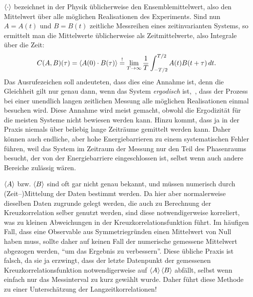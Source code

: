 $\left\langle{\cdot}\right\rangle$ bezeichnet in der Physik üblicherweise den
Ensemblemittelwert, also den Mittelwert über alle möglichen
Realisationen des Experiments. Sind nun $A=A(t)$ und $B=B(t)$
zeitliche Messreihen eines zeitinvarianten Systems, so ermittelt man
die Mittelwerte üblicherweise als Zeitmittelwerte, also Integrale über
die Zeit:
\begin{equation}
  \label{eq:crosscorrtime}
  C(A,B)(\tau) = \left\langle{A(0)\cdot B(\tau)}\right\rangle \stackrel{!}{=}
  \lim_{T\to\infty}\frac{1}{T}\int_{-T/2}^{T/2} A(t)B(t+\tau)\,dt.
\end{equation}
Das Ausrufezeichen soll andeuteten, dass dies eine Annahme ist, denn
die Gleichheit gilt nur genau dann, wenn das System \emph{ergodisch}
ist, \dh\,, dass der Prozess bei einer unendlich langen zeitlichen
Messung alle möglichen Realisationen einmal besuchen wird. Diese
Annahme wird meist gemacht, obwohl die Ergodizität für die meisten
Systeme nicht bewiesen werden kann. Hinzu kommt, dass ja in der Praxis
niemals über beliebig lange Zeiträume gemittelt werden kann. Daher
können auch endliche, aber hohe Energiebarrieren zu einem
systematischen Fehler führen, weil das System im Zeitraum der Messung
nur den Teil des Phasenraums besucht, der von der Energiebarriere
eingeschlossen ist, selbst wenn auch andere Bereiche zulässig wären.

$\left\langle{A}\right\rangle$ bzw. $\left\langle{B}\right\rangle$ sind oft gar nicht genau bekannt, und
müssen numerisch durch \mbox{(Zeit--)}Mittelung der Daten bestimmt
werden. Da hier aber normalerweise dieselben Daten zugrunde gelegt
werden, die auch zu Berechnung der Kreuzkorrelation selber genutzt
werden, sind diese notwendigerweise korreliert, was zu kleinen
Abweichungen in der Kreuzkorrelationsfunktion führt. Im häufigen Fall,
dass eine Observable aus Symmetriegründen einen Mittelwert von Null
haben muss, sollte daher auf keinen Fall der numerische gemessene
Mittelwert abgezogen werden, "`um das Ergebnis zu verbessern"'. Diese
übliche Praxis ist falsch, da sie ja erzwingt, dass der letzte
Datenpunkt der gemessenen Kreuzkorrelationsfunktion notwendigerweise
auf $\left\langle{A}\right\rangle\left\langle{B}\right\rangle$ abfällt, selbst wenn einfach nur das
Messinterval zu kurz gewählt wurde. Daher führt diese Methode zu einer
Unterschätzung der Langzeitkorrelationen!

